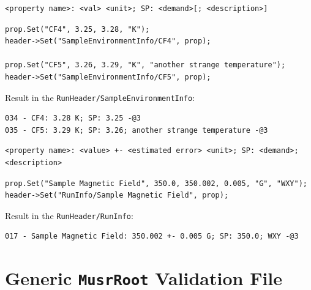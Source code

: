 \documentclass[twoside]{article}
\newcommand{\musrroot}{\texttt{MusrRoot}\xspace}
\begin{document}
\noindent\hrulefill

\begin{leftbar}
\begin{verbatim}
<property name>: <val> <unit>; SP: <demand>[; <description>]
\end{verbatim}
\end{leftbar}

\begin{shaded}
\begin{verbatim}  
prop.Set("CF4", 3.25, 3.28, "K");
header->Set("SampleEnvironmentInfo/CF4", prop);

prop.Set("CF5", 3.26, 3.29, "K", "another strange temperature");
header->Set("SampleEnvironmentInfo/CF5", prop);
\end{verbatim}
\end{shaded}

\noindent Result in the \texttt{RunHeader/SampleEnvironmentInfo}:
\begin{verbatim}
034 - CF4: 3.28 K; SP: 3.25 -@3
035 - CF5: 3.29 K; SP: 3.26; another strange temperature -@3
\end{verbatim}

\noindent\hrulefill

\begin{leftbar}
\begin{verbatim}
<property name>: <value> +- <estimated error> <unit>; SP: <demand>; <description>
\end{verbatim}
\end{leftbar}

\begin{shaded}
\begin{verbatim}  
prop.Set("Sample Magnetic Field", 350.0, 350.002, 0.005, "G", "WXY");
header->Set("RunInfo/Sample Magnetic Field", prop);
\end{verbatim}
\end{shaded}

\noindent Result in the \texttt{RunHeader/RunInfo}:
\begin{verbatim}
017 - Sample Magnetic Field: 350.002 +- 0.005 G; SP: 350.0; WXY -@3
\end{verbatim}

\section{Generic \musrroot Validation File}\label{sec:ValidationFile}
\end{document}
